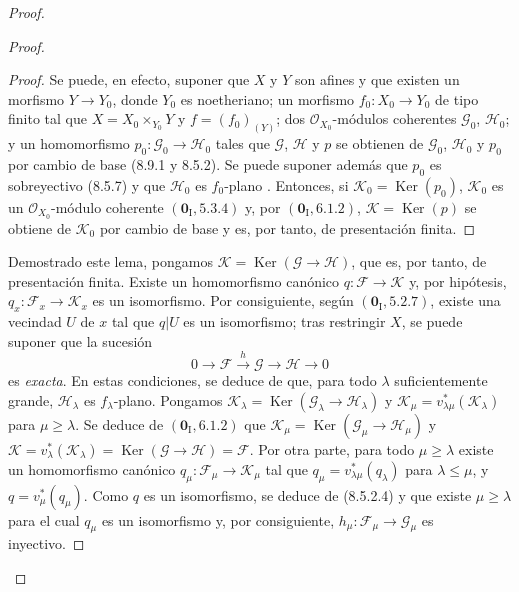 \begin{proof}
\begin{proof}
\begin{proof}
Se puede, en efecto, suponer que $X$ y $Y$ son afines y que existen un morfismo $Y\to Y_0$, donde $Y_0$ es noetheriano; un morfismo $f_0:X_0\to Y_0$ de tipo finito tal que $X=X_0\times_{Y_0}Y$ y $f=(f_0)_{(Y)}$; dos $\mathcal O_{X_0}$-módulos coherentes $\mathcal G_0$, $\mathcal H_0$; y un homomorfismo $p_0:\mathcal G_0\to\mathcal H_0$ tales que $\mathcal G$, $\mathcal H$ y $p$ se obtienen de $\mathcal G_0$, $\mathcal H_0$ y $p_0$ por cambio de base (8.9.1 y 8.5.2). Se puede suponer además que $p_0$ es sobreyectivo (8.5.7) y que $\mathcal H_0$ es $f_0$-plano . Entonces, si $\mathcal K_0=\operatorname{Ker}(p_0)$, $\mathcal K_0$ es un $\mathcal O_{X_0}$-módulo coherente $(\mathbf 0_{\mathrm I},5.3.4)$ y, por $(\mathbf 0_{\mathrm I},6.1.2)$, $\mathcal K=\operatorname{Ker}(p)$ se obtiene de $\mathcal K_0$ por cambio de base y es, por tanto, de presentación finita.
\end{proof}

Demostrado este lema, pongamos $\mathcal K=\operatorname{Ker}(\mathcal G\to\mathcal H)$, que es, por tanto, de presentación finita. Existe un homomorfismo canónico $q:\mathcal F\to\mathcal K$ y, por hipótesis, $q_x:\mathcal F_x\to\mathcal K_x$ es un isomorfismo. Por consiguiente, según $(\mathbf 0_{\mathrm I},5.2.7)$, existe una vecindad $U$ de $x$ tal que $q|U$ es un isomorfismo; tras restringir $X$, se puede suponer que la sucesión
\[
0\longrightarrow\mathcal F\xrightarrow{h}\mathcal G
\longrightarrow\mathcal H\longrightarrow0
\]
es \emph{exacta}. En estas condiciones, se deduce de  que, para todo $\lambda$ suficientemente grande, $\mathcal H_\lambda$ es $f_\lambda$-plano. Pongamos $\mathcal K_\lambda=\operatorname{Ker}(\mathcal G_\lambda\to\mathcal H_\lambda)$ y $\mathcal K_\mu=v_{\lambda\mu}^*(\mathcal K_\lambda)$ para $\mu\geq\lambda$. Se deduce de $(\mathbf 0_{\mathrm I},6.1.2)$ que
$\mathcal K_\mu=\operatorname{Ker}(\mathcal G_\mu\to\mathcal H_\mu)$ y
$\mathcal K=v_\lambda^*(\mathcal K_\lambda)
=\operatorname{Ker}(\mathcal G\to\mathcal H)=\mathcal F$.
Por otra parte, para todo $\mu\geq\lambda$ existe un homomorfismo canónico $q_\mu:\mathcal F_\mu\to\mathcal K_\mu$ tal que $q_\mu=v_{\lambda\mu}^*(q_\lambda)$ para $\lambda\leq\mu$, y $q=v_\mu^*(q_\mu)$. Como $q$ es un isomorfismo, se deduce de (8.5.2.4) y  que existe $\mu\geq\lambda$ para el cual $q_\mu$ es un isomorfismo y, por consiguiente, $h_\mu:\mathcal F_\mu\to\mathcal G_\mu$ es inyectivo.
\end{proof}


\end{proof}

